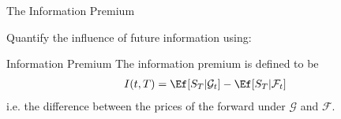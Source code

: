   {The Information Premium}
\vspace{-0.5cm}


 Quantify the influence of future information using:

\begin{block}{Information Premium}
The information premium is defined to be
\begin{align*}
I(t,T) = \Ef[S_T | \mathcal{G}_t] - \Ef[S_T | \mathcal{F}_t]
\end{align*}
i.e. the difference between the prices of the forward under $\mathcal{G}$ and $\mathcal{F}$.
\end{block}














